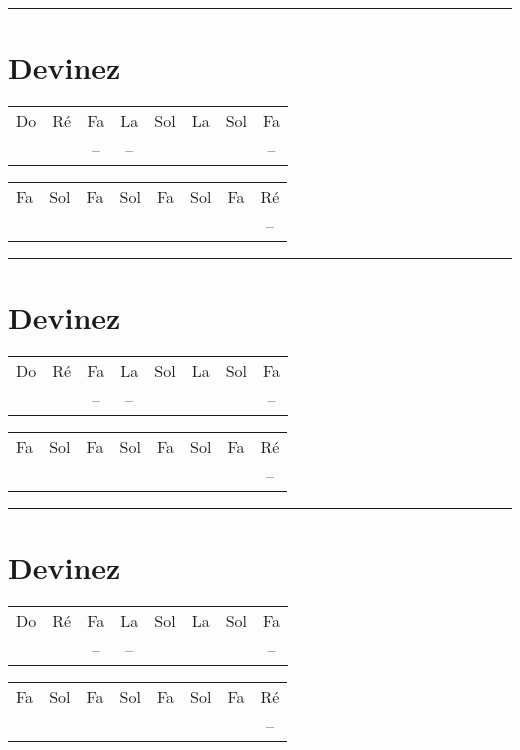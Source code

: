 \documentclass[12pt,a4paper]{article}
\begin{document}
\hrule{}

\section*{Devinez}

\begin{center}
\begin{tabular}{|cccccccc|}
\hline
Do 		& Ré 		& Fa 		& La 		& Sol		& La 		& Sol		& Fa 		\\
\cdot	& \cdot	& --			& --			& \cdot	& \cdot	& \cdot	& --	\\
\hline
\end{tabular}
\begin{tabular}{|cccccccc|}
\hline
Fa 		& Sol 		& Fa 		& Sol 		& Fa		& Sol 		& Fa		& Ré 		\\
\cdot	& \cdot	& \cdot	& \cdot	& \cdot	& \cdot	& \cdot	& --	\\
\hline
\end{tabular}
\end{center}

\hrule{}

\section*{Devinez}

\begin{center}
\begin{tabular}{|cccccccc|}
\hline
Do 		& Ré 		& Fa 		& La 		& Sol		& La 		& Sol		& Fa 		\\
\cdot	& \cdot	& --			& --			& \cdot	& \cdot	& \cdot	& --	\\
\hline
\end{tabular}
\begin{tabular}{|cccccccc|}
\hline
Fa 		& Sol 		& Fa 		& Sol 		& Fa		& Sol 		& Fa		& Ré 		\\
\cdot	& \cdot	& \cdot	& \cdot	& \cdot	& \cdot	& \cdot	& --	\\
\hline
\end{tabular}
\end{center}

\hrule{}

\section*{Devinez}

\begin{center}
\begin{tabular}{|cccccccc|}
\hline
Do 		& Ré 		& Fa 		& La 		& Sol		& La 		& Sol		& Fa 		\\
\cdot	& \cdot	& --			& --			& \cdot	& \cdot	& \cdot	& --	\\
\hline
\end{tabular}
\begin{tabular}{|cccccccc|}
\hline
Fa 		& Sol 		& Fa 		& Sol 		& Fa		& Sol 		& Fa		& Ré 		\\
\cdot	& \cdot	& \cdot	& \cdot	& \cdot	& \cdot	& \cdot	& --	\\
\hline
\end{tabular}
\end{center}
\end{document}
